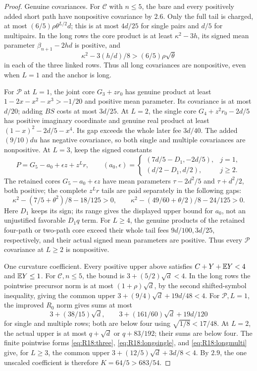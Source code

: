 \begin{proof}
Genuine covariances. For \(\mathcal C\) with \(n\le5\), the
bare and every positively added short path have nonpositive covariance
by \(2.6\). Only the full tail is charged, at most
\((6/5)\rho\theta^{L/2}d\); this is at most \(4d/25\) for
single pairs and \(d/5\) for multipairs.
In the long rows the core product is at least \(\kappa^2-3h\),
its signed mean parameter \(\beta_{n+1}-2hd\) is positive, and
\[
 \kappa^2-3(h/d)/8>(6/5)\rho\sqrt\theta
\]
in each of the three linked rows. Thus all long covariances are
nonpositive, even when \(L=1\) and the anchor is long.

For \(\mathcal P\) at \(L=1\), the joint core
\(G_3+zr_0\) has genuine product at least
\(1-2x-x^2-x^3>-1/20\) and positive mean parameter.
Its covariance is at most \(d/20\); adding \(BS\) costs at
most \(3d/25\). At \(L=2\), the single core
\(G_4+z^2r_0-2d/5\) has positive imaginary coordinate and
genuine real product at least \((1-x)^2-2d/5-x^4\).
Its gap exceeds the whole later fee \(3d/40\). The added
\((9/10)du\) has negative covariance, so both single and multiple
covariances are nonpositive.
At \(L=3\), keep the signed constants
\[
 P=G_5-a_0+\epsilon z+z^Lr,\qquad
 (a_0,\epsilon)=
 \begin{cases}
 (7d/5-D_1,-2d/5),&j=1,\\
 (d/2-D_1,d/2),&j\ge2.
 \end{cases}
\]
The retained cores \(G_5-a_0+\epsilon z\) have mean parameters
\(\tau-2d^2/5\) and \(\tau+d^2/2\), both positive; the
complete \(z^Lr\) tails are paid separately in the following gaps:
\[
 \kappa^2-(7/5+\theta^2)/8-18/125>0,\qquad
 \kappa^2-(49/60+\theta/2)/8-24/125>0.
\]
Here \(D_1\) keeps its sign; its range gives the displayed upper
bound for \(a_0\), not an unjustified favorable \(D_1q\) term.
For \(L\ge4\), the genuine products of the retained four-path
or two-path core exceed their whole tail fees \(9d/100,3d/25\),
respectively, and their actual signed mean parameters are positive.
Thus every \(\mathcal P\) covariance at \(L\ge2\) is nonpositive.

One curvature coefficient. Every positive upper above satisfies
\(C+Y+\mathbb E Y<4\) and \(\mathbb E Y\le1\). For \(\mathcal C,n\le5\),
the bound is \(3+(5/2)\sqrt d<4\). In the long rows the
pointwise precursor norm is at most \((1+\rho)\sqrt d\), by
the second shifted-symbol inequality, giving the common upper
\(3+(9/4)\sqrt d+19d/48<4\).
For \(\mathcal P,L=1\), the improved \(R_0\) norm gives sums
at most
\[
 3+(38/15)\sqrt d,\qquad
 3+(161/60)\sqrt d+19d/120
\]
for single and multiple rows; both are below four using
\(\sqrt{1/8}<17/48\). At \(L=2\), the actual upper is at
most \(q+\sqrt d\) or \(q+83/192\); their sums are below four.
The finite pointwise forms \eqref{eq:R18:three},
\eqref{eq:R18:longsingle}, and \eqref{eq:R18:longmulti} give,
for \(L\ge3\), the common upper
\(3+(12/5)\sqrt d+3d/8<4\).
By \(2.9\), the one unscaled coefficient is therefore
\(K=64/5>683/54\).


\end{proof}
